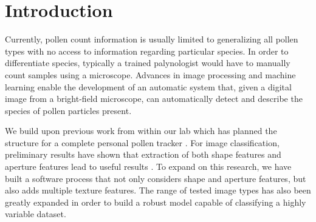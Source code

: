 \section{Introduction}

Currently, pollen count information is usually limited to generalizing all pollen types with no access to information regarding particular species. In order to differentiate species, typically a trained palynologist would have to manually count samples using a microscope. Advances in image processing and machine learning enable the development of an automatic system that, given a digital image from a bright-field microscope, can automatically detect and describe the species of pollen particles present.

We build upon previous work from within our lab which has planned the structure for a complete personal pollen tracker \cite{Lozano_2012}. For image classification, preliminary results have shown that extraction of both shape features and aperture features lead to useful results \cite{Lozano_2014}. To expand on this research, we have built a software process that not only considers shape and aperture features, but also adds multiple texture features. The range of tested image types has also been greatly expanded in order to build a robust model capable of classifying a highly variable dataset. 

  
  
  
  